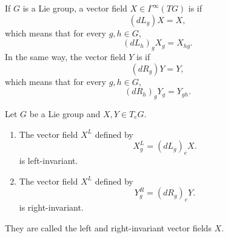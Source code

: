 \begin{definition}        \label{DEFooYHKXooVoJalX}
	If $G$ is a Lie group, a vector field $X\in\Gamma^{\infty}(TG)$ is  if
	\begin{equation}
		(dL_g) X= X,
	\end{equation}
	which means that for every \( g,h\in G\),
	\begin{equation}		\label{EQooMKVSooKzxQET}
		(dL_h)_gX_g=X_{hg}.
	\end{equation}
	In the same way, the vector field \( Y\) is  if
	\begin{equation}
		(dR_g)Y=Y,
	\end{equation}
	which means that for every \( g,h\in G\),
	\begin{equation}		\label{EQooPKVNooBFHWNM}
		(dR_h)_gY_g=Y_{gh}.
	\end{equation}
\end{definition}

\begin{propositionDef}      \label{PROPooLEIAooTnnYRw}
	Let \( G\) be a Lie group and \( X,Y\in T_eG\).
	\begin{enumerate}
		\item		\label{ITEMooCFCWooOhEEYZ}
		      The vector field \( X^L\) defined by
		      \begin{equation}        \label{DEFooYPUIooAzcdjP}
			      X^L_g=(dL_g)_eX.
		      \end{equation}
		      is left-invariant.
		\item		\label{ITEMooZTLRooMkOYzH}
		      The vector field \( X^L\) defined by
		      \begin{equation}
			      Y^R_g=(dR_g)_eY.
		      \end{equation}
		      is right-invariant.
	\end{enumerate}
	They are called the left and right-invariant vector fields  \( X\).
\end{propositionDef}

